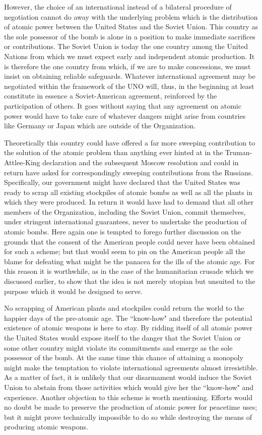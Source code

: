 However, the choice of an international instead of a bilateral procedure of negotiation cannot do away with the underlying problem which is the distribution of atomic power between the United States and the Soviet Union. This country as the sole possessor of the bomb is alone in a position to make immediate sacrifices or contributions. The Soviet Union is today the one country among the United Nations from which we must expect early and independent atomic production. It is therefore the one country from which, if we are to make concessions, we must insist on obtaining reliable safeguards. Whatever international agreement may be negotiated within the framework of the UNO will, thus, in the beginning at least constitute in essence a Soviet-American agreement, reinforced by the participation of others. It goes without saying that any agreement on atomic power would have to take care of whatever dangers might arise from countries like Germany or Japan which are outside of the Organization.

Theoretically this country could have offered a far more sweeping contribution to the solution of the atomic problem than anything ever hinted at in the Truman-Attlee-King declaration and the subsequent Moscow resolution and could in return have asked for correspondingly sweeping contributions from the Russians. Specifically, our government might have declared that the United States was ready to scrap all existing stockpiles of atomic bombs as well as all the plants in which they were produced. In return it would have had to demand that all other members of the Organization, including the Soviet Union, commit themselves, under stringent international guarantees, never to undertake the production of atomic bombs. Here again one is tempted to forego further discussion on the grounds that the consent of the American people could never have been obtained for such a scheme; but that would seem to pin on the American people all the blame for defeating what might be the panacea for the ills of the atomic age. For this reason it is worthwhile, as in the case of the humanitarian crusade which we discussed earlier, to show that the idea is not merely utopian but unsuited to the purpose which it would be designed to serve.

No scrapping of American plants and stockpiles could return the world to the happier days of the pre-atomic age. The ``know-how" and therefore the potential existence of atomic weapons is here to stay. By ridding itself of all atomic power the United States would expose itself to the danger that the Soviet Union or some other country might violate its commitments and emerge as the sole possessor of the bomb. At the same time this chance of attaining a monopoly might make the temptation to violate international agreements almost irresistible. As a matter of fact, it is unlikely that our disarmament would induce the Soviet Union to abstain from those activities which would give her the ``know-how" and experience. Another objection to this scheme is worth mentioning. Efforts would no doubt be made to preserve the production of atomic power for peacetime uses; but it might prove technically impossible to do so while destroying the means of producing atomic weapons.

